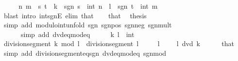 \begin{isabellebody}
\endisadelimproof
%
\isatagproof
{}\isamarkupfalse%
\ {\isacharminus}{\kern0pt}\isanewline
\ \ \isamarkupfalse%
\ n\ m\ \ s\ t\ \ {\isachardoublequoteopen}k\ {\isacharequal}{\kern0pt}\ sgn\ s\ {\isacharasterisk}{\kern0pt}\ int\ n{\isachardoublequoteclose}\ \ {\isachardoublequoteopen}l\ {\isacharequal}{\kern0pt}\ sgn\ t\ {\isacharasterisk}{\kern0pt}\ int\ m{\isachardoublequoteclose}\ \isanewline
\ \ \ \ \isamarkupfalse%
\ {\isacharparenleft}{\kern0pt}blast\ intro{\isacharcolon}{\kern0pt}\ int{\isacharunderscore}{\kern0pt}sgnE\ elim{\isacharcolon}{\kern0pt}\ that{\isacharparenright}{\kern0pt}\isanewline
\ \ \isamarkupfalse%
\ that\ \isamarkupfalse%
\ {\isacharquery}{\kern0pt}thesis\isanewline
\ \ \ \ \isamarkupfalse%
\ {\isacharparenleft}{\kern0pt}simp\ add{\isacharcolon}{\kern0pt}\ modulo{\isacharunderscore}{\kern0pt}int{\isacharunderscore}{\kern0pt}unfold\ sgn{\isacharunderscore}{\kern0pt}{}{\isacharunderscore}{\kern0pt}{}\ sgn{\isacharunderscore}{\kern0pt}{}{\isacharunderscore}{\kern0pt}pos\ sgn{\isacharunderscore}{\kern0pt}{}{\isacharunderscore}{\kern0pt}neg\ sgn{\isacharunderscore}{\kern0pt}mult{\isacharparenright}{\kern0pt}\isanewline
\ \ \ \ \ \ {\isacharparenleft}{\kern0pt}simp\ add{\isacharcolon}{\kern0pt}\ dvd{\isacharunderscore}{\kern0pt}eq{\isacharunderscore}{\kern0pt}mod{\isacharunderscore}{\kern0pt}eq{\isacharunderscore}{\kern0pt}{}{\isacharparenright}{\kern0pt}\isanewline
{}\isamarkupfalse%
%
\endisatagproof
{\isafoldproof}%
%
\isadelimproof
\isanewline
%
\endisadelimproof
\isanewline
{}\isamarkupfalse%
%
\isadelimproof
\ %
\endisadelimproof
%
\isatagproof
{}\isamarkupfalse%
\isanewline
\ \ \isamarkupfalse%
\ k\ l\ {\isacharcolon}{\kern0pt}{\isacharcolon}{\kern0pt}\ int\isanewline
\ \ \isamarkupfalse%
\ {\isachardoublequoteopen}division{\isacharunderscore}{\kern0pt}segment\ {\isacharparenleft}{\kern0pt}k\ mod\ l{\isacharparenright}{\kern0pt}\ {\isacharequal}{\kern0pt}\ division{\isacharunderscore}{\kern0pt}segment\ l{\isachardoublequoteclose}\ \isanewline
\ \ \ \ {\isachardoublequoteopen}l\ {\isasymnoteq}\ {}{\isachardoublequoteclose}\ \ {\isachardoublequoteopen}{\isasymnot}\ l\ dvd\ k{\isachardoublequoteclose}\isanewline
\ \ \ \ \isamarkupfalse%
\ that\ \isamarkupfalse%
\ {\isacharparenleft}{\kern0pt}simp\ add{\isacharcolon}{\kern0pt}\ division{\isacharunderscore}{\kern0pt}segment{\isacharunderscore}{\kern0pt}eq{\isacharunderscore}{\kern0pt}sgn\ dvd{\isacharunderscore}{\kern0pt}eq{\isacharunderscore}{\kern0pt}mod{\isacharunderscore}{\kern0pt}eq{\isacharunderscore}{\kern0pt}{}\ sgn{\isacharunderscore}{\kern0pt}mod{\isacharparenright}{\kern0pt}\isanewline

\end{isabellebody}
